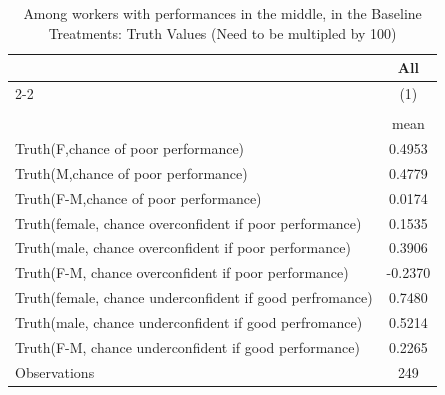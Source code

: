 \begin{table}[htbp]\centering
\def\sym#1{\ifmmode^{#1}\else\(^{#1}\)\fi}
\caption{Among workers with performances in the middle, in the Baseline Treatments: Truth Values (Need to be multipled by 100)}
\begin{tabular}{l*{1}{c}}
\hline\hline
                    &\multicolumn{1}{c}{All}\\\cmidrule(lr){2-2}
                    &\multicolumn{1}{c}{(1)}\\
                    &\multicolumn{1}{c}{}\\
                    &        mean\\
\hline
Truth(F,chance of poor performance)&      0.4953\\
Truth(M,chance of poor performance)&      0.4779\\
Truth(F-M,chance of poor performance)&      0.0174\\
Truth(female, chance overconfident if poor performance)&      0.1535\\
Truth(male, chance overconfident if poor performance)&      0.3906\\
Truth(F-M, chance overconfident if poor performance)&     -0.2370\\
Truth(female, chance underconfident if good perfromance)&      0.7480\\
Truth(male, chance underconfident if good perfromance)&      0.5214\\
Truth(F-M, chance underconfident if good performance)&      0.2265\\
\hline
Observations        &         249\\
\hline\hline
\end{tabular}
\end{table}
